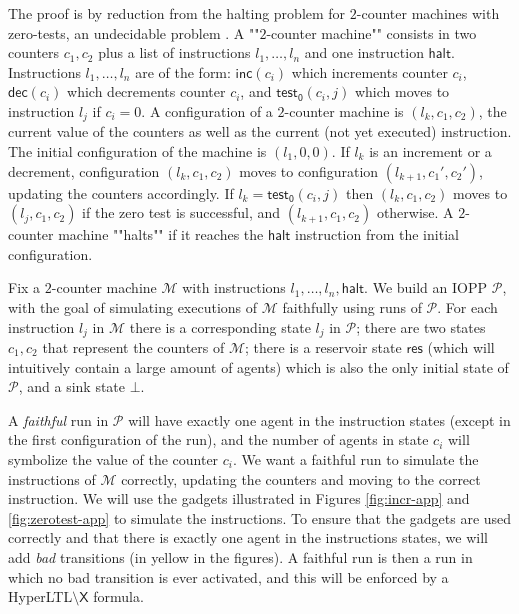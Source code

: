 \documentclass[10pt,a4paper]{article}
\newcommand{\PP}{\mathcal{P}}                  %
\newcommand{\ltlnext}{\mathsf{X}}
\newcommand{\machine}{\mathcal{M}}
\newcommand{\incr}{\mathsf{inc}}
\newcommand{\decr}{\mathsf{dec}}
\newcommand{\zero}{\mathsf{test_0}}
\newcommand{\halt}{\mathsf{halt}}
\newcommand{\res}{\mathsf{res}} %
\begin{document}
\begin{appendixproof}
	The proof is by reduction from the halting problem for \(2\)-counter machines with zero-tests, an undecidable problem \cite{Minsky67}.
	A ""\(2\)-counter machine"" consists in two counters \(c_1,c_2\) plus a list of instructions \(l_1, \ldots, l_n\) and one instruction \(\halt\).
	Instructions \(l_1, \ldots, l_n\) are of the form: \(\incr(c_i)\) which increments counter \(c_i\), \(\decr(c_i)\) which decrements counter \(c_i\), and \(\zero(c_i,j)\) which moves to instruction \(l_j\) if \(c_i =0\).
	A configuration of a \(2\)-counter machine is \((l_k, c_1, c_2)\), the current value of the counters as well as the current (not yet executed) instruction.
	The initial configuration of the machine is \((l_1, 0, 0)\).
	If \(l_k\) is an increment or a decrement, configuration \((l_k, c_1, c_2)\) moves to configuration \((l_{k+1}, c_1', c_2')\), updating the counters accordingly.
	If \(l_k=\zero(c_i,j)\) then \((l_k, c_1, c_2)\) moves to \((l_j, c_1, c_2)\) if the zero test is successful, and \((l_{k+1}, c_1, c_2)\) otherwise.
	A \(2\)-counter machine ""halts"" if it reaches the \(\halt\) instruction from the initial configuration.

	Fix a \(2\)-counter machine \(\machine\) with instructions \(l_1, \ldots, l_n,\halt\).
	We build an IOPP \(\PP\), with the goal of simulating executions of \(\machine\) faithfully using runs of \(\PP\).
	For each instruction \(l_j\) in \(\machine\) there is a corresponding state \(l_j\) in \(\PP\); there are two states \(c_1,c_2\) that represent the counters of \(\machine\); there is a reservoir state \(\res\) (which will intuitively contain a large amount of agents) which is also the only initial state of \(\PP\), and a sink state \(\bot\).

	A \emph{faithful} run in \(\PP\) will have exactly one agent in the instruction states (except in the first configuration of the run), and the number of agents in state \(c_i\) will symbolize the value of the counter \(c_i\).
	We want a faithful run to simulate the instructions of \(\machine\) correctly, updating the counters and moving to the correct instruction.
	We will use the gadgets illustrated in Figures \ref{fig:incr-app} and \ref{fig:zerotest-app} to simulate the instructions.
	To ensure that the gadgets are used correctly and that there is exactly one agent in the instructions states, we will add \emph{bad} transitions (in yellow in the figures).
	A faithful run is then a run in which no bad transition is ever activated, and this will be enforced by a HyperLTL\(\setminus \ltlnext\) formula.


\end{appendixproof}
\end{document}

